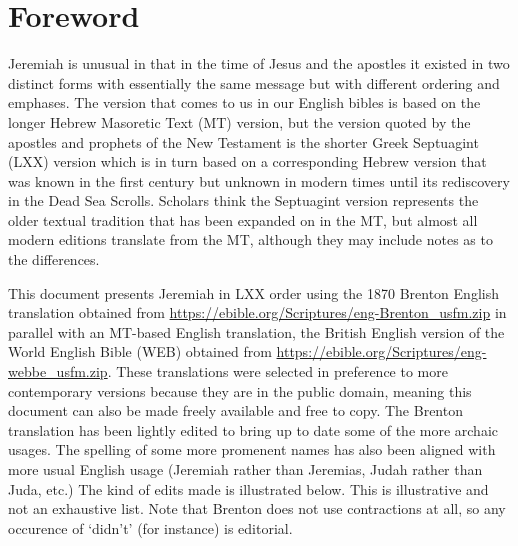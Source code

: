 \section*{Foreword}

Jeremiah is unusual in that in the time of Jesus and the apostles it existed in two distinct forms with essentially the same message but with different ordering and emphases. The version that comes to us in our English bibles is based on the longer Hebrew Masoretic Text (MT) version, but the version quoted by the apostles and prophets of the New Testament is the shorter Greek Septuagint (LXX) version which is in turn based on a corresponding Hebrew version that was known in the first century but unknown in modern times until its rediscovery in the Dead Sea Scrolls. Scholars think the Septuagint version represents the older textual tradition that has been expanded on in the MT, but almost all modern editions translate from the MT, although they may include notes as to the differences.

\hspace{1.5em} This document presents Jeremiah in LXX order using the 1870 Brenton English translation obtained from \url{https://ebible.org/Scriptures/eng-Brenton_usfm.zip}
in parallel with an MT-based English translation, the British English version of the World English Bible (WEB) obtained from \url{https://ebible.org/Scriptures/eng-webbe_usfm.zip}. These translations were selected in preference to more contemporary versions because they are in the public domain, meaning this document can also be made freely available and free to copy. The Brenton translation has been lightly edited to bring up to date some of the more archaic usages. The spelling of some more promenent names has also been aligned with more usual English usage (Jeremiah rather than Jeremias, Judah rather than Juda, etc.) The kind of edits made is illustrated below. This is illustrative and not an exhaustive list. Note that Brenton does not use contractions at all, so any occurence of `didn't' (for instance) is editorial.

